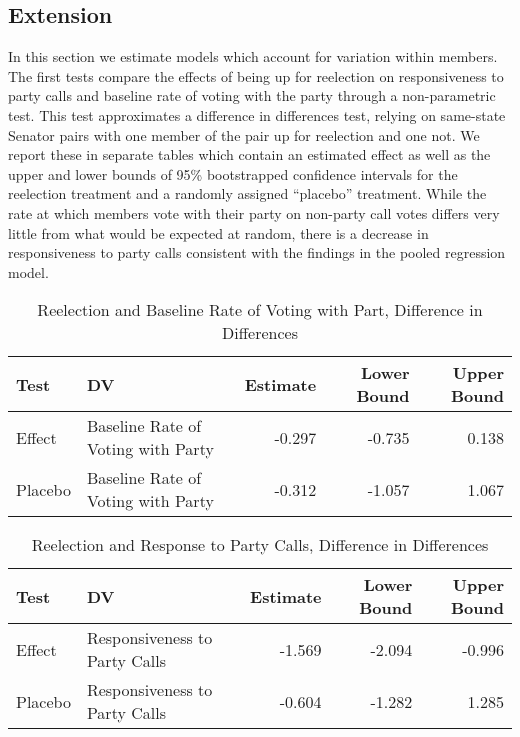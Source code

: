 \documentclass[12pt]{article}
\begin{document}
\subsection{Extension}

In this section we estimate models which account for variation within members. The first tests compare the effects of being up for reelection on responsiveness to party calls and baseline rate of voting with the party through a non-parametric test. This test approximates a difference in differences test, relying on same-state Senator pairs with one member of the pair up for reelection and one not. We report these in separate tables which contain an estimated effect as well as the upper and lower bounds of 95\% bootstrapped confidence intervals for the reelection treatment and a randomly assigned ``placebo'' treatment. While the rate at which members vote with their party on non-party call votes differs very little from what would be expected at random, there is a decrease in responsiveness to party calls consistent with the findings in the pooled regression model.

\begin{table}[H]
	\centering
	\caption{Reelection and Baseline Rate of Voting with Part, Difference in Differences} 
	\begin{tabular}{llrrr}
		\hline
		Test & DV & Estimate & Lower Bound & Upper Bound \\ 
		\hline
		Effect & Baseline Rate of Voting with Party & -0.297 & -0.735 & 0.138 \\ 
		Placebo & Baseline Rate of Voting with Party & -0.312 & -1.057 & 1.067 \\ 
		\hline
	\end{tabular}
\end{table}

\begin{table}[H]
	\centering
	\caption{Reelection and Response to Party Calls, Difference in Differences} 
	\begin{tabular}{llrrr}
		\hline
		Test & DV & Estimate & Lower Bound & Upper Bound \\ 
		\hline
		Effect & Responsiveness to Party Calls & -1.569 & -2.094 & -0.996 \\ 
		Placebo & Responsiveness to Party Calls & -0.604 & -1.282 & 1.285 \\ 
		\hline
	\end{tabular}
\end{table}
\end{document}
